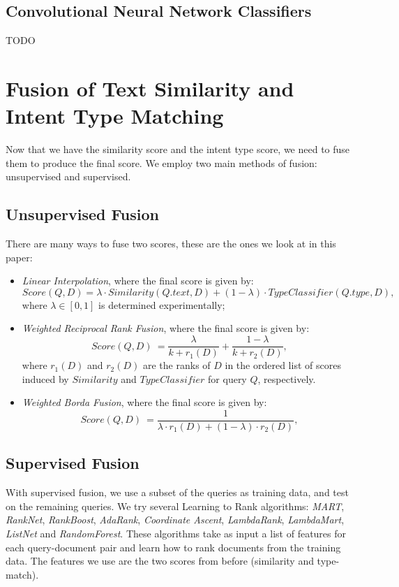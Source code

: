 \subsection{Convolutional Neural Network Classifiers}
TODO

\section{Fusion of Text Similarity and Intent Type Matching}
Now that we have the similarity score and the intent type score, we need to fuse them to produce the final score.
We employ two main methods of fusion: unsupervised and supervised.

\subsection{Unsupervised Fusion}
There are many ways to fuse two scores, these are the ones we look at in this paper:
\begin{itemize}
 \item \emph{Linear Interpolation}, where the final score is given by:
\[  Score(Q, D) = \lambda \cdot Similarity(Q.text, D) + (1-\lambda) \cdot TypeClassifier(Q.type, D),\]
where $\lambda\in [0,1]$ is determined experimentally;
 \item \emph{Weighted Reciprocal Rank Fusion}, where the final score is given by:
  \[Score(Q,D)\ =  \displaystyle\frac{\lambda}{k + r_1(D)} + \displaystyle\frac{1- \lambda}{k + r_2(D)}, \]
  where $r_1(D)$ and $r_2(D)$ are the ranks of $D$ in the ordered list of scores induced by $Similarity$ and $TypeClassifier$ for query $Q$, respectively.
 \item \emph{Weighted Borda Fusion},  where the final score is given by:
  \[Score(Q,D)\ =  \displaystyle\frac{1}{\lambda \cdot r_1(D) + (1-\lambda)\cdot r_2(D)}, \]
\end{itemize}

\subsection{Supervised Fusion}
With supervised fusion, we use a subset of the queries as training data, and test on the remaining queries.
We try several Learning to Rank algorithms: \emph{MART}, \emph{RankNet}, \emph{RankBoost}, \emph{AdaRank},
\emph{Coordinate Ascent}, \emph{LambdaRank}, \emph{LambdaMart}, \emph{ListNet} and \emph{RandomForest}.
These algorithms take as input a list of features for each query-document pair and learn how to rank documents from the training
data.
The features we use are the two scores from before (similarity and type-match).


